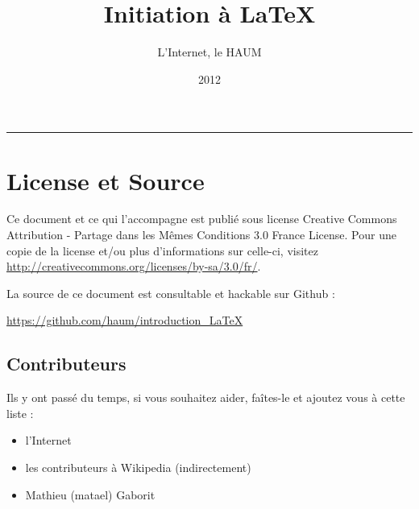 \documentclass[a4paper, 11pt, twoside]{report}
\title{Initiation à \LaTeX}
\author{L'Internet, le HAUM}
\date{2012}
\makeatletter
\renewcommand{\maketitle}{\begin{titlepage}%
    \let\footnotesize\small
    \let\footnoterule\relax
    \parindent \z@
    \reset@font
    \null\vfil
    \begin{flushright}
    \huge \@title
    \end{flushright}
    \par
    \hrule height 5pt
    \par
    \begin{flushright}
    \LARGE \@author \par
    \Large \@date \par
    \end{flushright}
    \vskip 60\p@
    \vfil\null
    \end{titlepage}%
    \setcounter{footnote}{0}%
    }
\makeatother
\begin{document}
    \maketitle

    \tableofcontents
    \newpage
    
    \section*{License et Source} %

    Ce document et ce qui l'accompagne est publié sous license Creative Commons Attribution -  Partage dans les Mêmes Conditions 3.0 France
    License. Pour une copie de la license et/ou plus d'informations sur celle-ci, visitez
    \url{http://creativecommons.org/licenses/by-sa/3.0/fr/}.

    \bigskip

    La source de ce document est consultable et hackable sur Github :

    \begin{center}
    \url{https://github.com/haum/introduction_LaTeX}
    \end{center}

    \bigskip

    \subsection*{Contributeurs}

    Ils y ont passé du temps, si vous souhaitez aider, faîtes-le et ajoutez vous à cette liste :

    \begin{itemize}
        \item l'Internet
        \item les contributeurs à Wikipedia (indirectement)
        \item Mathieu (matael) Gaborit
    \end{itemize}
    \newpage

    
    
    
     
\end{document}
